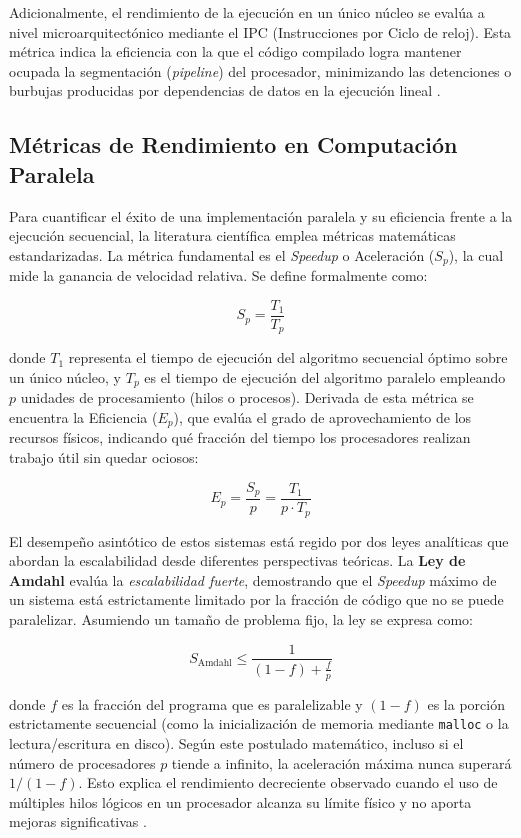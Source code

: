 Adicionalmente, el rendimiento de la ejecución en un único núcleo se evalúa a nivel microarquitectónico mediante el IPC (Instrucciones por Ciclo de reloj). Esta métrica indica la eficiencia con la que el código compilado logra mantener ocupada la segmentación (\textit{pipeline}) del procesador, minimizando las detenciones o burbujas producidas por dependencias de datos en la ejecución lineal \parencite{Yi2020CPI}.


\subsection{Métricas de Rendimiento en Computación Paralela}
Para cuantificar el éxito de una implementación paralela y su eficiencia frente a la ejecución secuencial, la literatura científica emplea métricas matemáticas estandarizadas. La métrica fundamental es el \textit{Speedup} o Aceleración (\(S_p\)), la cual mide la ganancia de velocidad relativa. Se define formalmente como:

\begin{equation}
    S_p = \frac{T_1}{T_p}
\end{equation}

donde \(T_1\) representa el tiempo de ejecución del algoritmo secuencial óptimo sobre un único núcleo, y \(T_p\) es el tiempo de ejecución del algoritmo paralelo empleando \(p\) unidades de procesamiento (hilos o procesos). Derivada de esta métrica se encuentra la Eficiencia (\(E_p\)), que evalúa el grado de aprovechamiento de los recursos físicos, indicando qué fracción del tiempo los procesadores realizan trabajo útil sin quedar ociosos:

\begin{equation}
    E_p = \frac{S_p}{p} = \frac{T_1}{p \cdot T_p}
\end{equation}

El desempeño asintótico de estos sistemas está regido por dos leyes analíticas que abordan la escalabilidad desde diferentes perspectivas teóricas. La \textbf{Ley de Amdahl} evalúa la \textit{escalabilidad fuerte}, demostrando que el \textit{Speedup} máximo de un sistema está estrictamente limitado por la fracción de código que no se puede paralelizar. Asumiendo un tamaño de problema fijo, la ley se expresa como:

\begin{equation}
    S_{\text{Amdahl}} \leq \frac{1}{(1 - f) + \frac{f}{p}}
\end{equation}

donde \(f\) es la fracción del programa que es paralelizable y \((1 - f)\) es la porción estrictamente secuencial (como la inicialización de memoria mediante \texttt{malloc} o la lectura/escritura en disco). Según este postulado matemático, incluso si el número de procesadores \(p\) tiende a infinito, la aceleración máxima nunca superará \(1 / (1 - f)\). Esto explica el rendimiento decreciente observado cuando el uso de múltiples hilos lógicos en un procesador alcanza su límite físico y no aporta mejoras significativas \parencite{Patterson2017Computer}.

